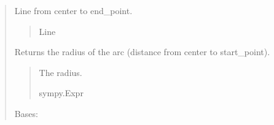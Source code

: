 \documentclass[letterpaper,10pt,english]{sphinxmanual}
\begin{document}
\begin{quote}
\begin{fulllineitems}
\begin{fulllineitems}
\begin{quote}
\begin{description}
\end{description}\end{quote}

\end{fulllineitems}


\begin{fulllineitems}
\label{\detokenize{pygeox:pygeox.basic_objects.BaseArc.end_radius_line}}
\pysigstartsignatures
\pysigline
{}
\pysigstopsignatures
\sphinxAtStartPar
Line from center to end\_point.
\begin{quote}\begin{description}
\sphinxAtStartPar
Line

\end{description}\end{quote}

\end{fulllineitems}


\begin{fulllineitems}
\label{\detokenize{pygeox:pygeox.basic_objects.BaseArc.radius}}
\pysigstartsignatures
\pysigline
{}
\pysigstopsignatures
\sphinxAtStartPar
Returns the radius of the arc (distance from center to start\_point).
\begin{quote}\begin{description}
\sphinxAtStartPar
The radius.

\sphinxAtStartPar
sympy.Expr

\end{description}\end{quote}

\end{fulllineitems}


\end{fulllineitems}


\begin{fulllineitems}
\label{\detokenize{pygeox:pygeox.basic_objects.Circle}}
\pysigstartsignatures
\pysiglinewithargsret
{}
{\sphinxparamcomma {}\sphinxparamcomma {}}
{}
\pysigstopsignatures
\sphinxAtStartPar
Bases: 


\end{fulllineitems}
\end{quote}
\end{document}
